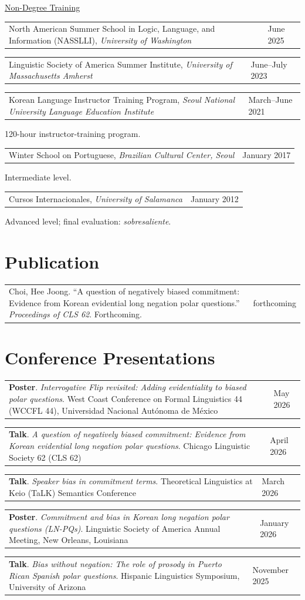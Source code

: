\documentclass[10pt,letterpaper]{article}
\makeatletter
\newcommand{\datedentry}[2]{%
  \noindent\begin{tabularx}{\textwidth}{@{}X>{\raggedleft\arraybackslash}p{1.45in}@{}}
    #1 & \textcolor{muted}{#2}
  \end{tabularx}\par
}
\newcommand{\subentry}[1]{%
  \hspace*{0.9em}\begin{minipage}{\dimexpr\textwidth-0.9em\relax}
    \small #1
  \end{minipage}\par
}
\newcommand{\educationdetail}[1]{%
  \vspace{-1pt}\subentry{#1}
}
\newcommand{\traininggap}{\vspace{2pt}}
\newcommand{\presentation}[4]{%
  \datedentry{\textbf{#1}. \textit{#2}. #3}{#4}\vspace{2pt}
}
\makeatother
\begin{document}
\vspace{7pt}
{\normalsize\underline{Non-Degree Training}}

\vspace{2pt}
\datedentry{North American Summer School in Logic, Language, and Information (NASSLLI), \textit{University of Washington}}{June 2025}
\traininggap
\datedentry{Linguistic Society of America Summer Institute, \textit{University of Massachusetts Amherst}}{June--July 2023}
\traininggap
\datedentry{Korean Language Instructor Training Program, \textit{Seoul National University Language Education Institute}}{March--June 2021}
\educationdetail{120-hour instructor-training program.}
\traininggap
\datedentry{Winter School on Portuguese, \textit{Brazilian Cultural Center, Seoul}}{January 2017}
\educationdetail{Intermediate level.}
\traininggap
\datedentry{Cursos Internacionales, \textit{University of Salamanca}}{January 2012}
\educationdetail{Advanced level; final evaluation: \textit{sobresaliente}.}

\section{Publication}

\datedentry{Choi, Hee Joong. ``A question of negatively biased commitment: Evidence from Korean evidential long negation polar questions.'' \textit{Proceedings of CLS 62}. Forthcoming.}{forthcoming}

\section{Conference Presentations}

\presentation{Poster}{Interrogative Flip revisited: Adding evidentiality to biased polar questions}{West Coast Conference on Formal Linguistics 44 (WCCFL 44), Universidad Nacional Autónoma de México}{May 2026}

\presentation{Talk}{A question of negatively biased commitment: Evidence from Korean evidential long negation polar questions}{Chicago Linguistic Society 62 (CLS 62)}{April 2026}

\presentation{Talk}{Speaker bias in commitment terms}{Theoretical Linguistics at Keio (TaLK) Semantics Conference}{March 2026}

\presentation{Poster}{Commitment and bias in Korean long negation polar questions (LN-PQs)}{Linguistic Society of America Annual Meeting, New Orleans, Louisiana}{January 2026}

\presentation{Talk}{Bias without negation: The role of prosody in Puerto Rican Spanish polar questions}{Hispanic Linguistics Symposium, University of Arizona}{November 2025}
\end{document}
